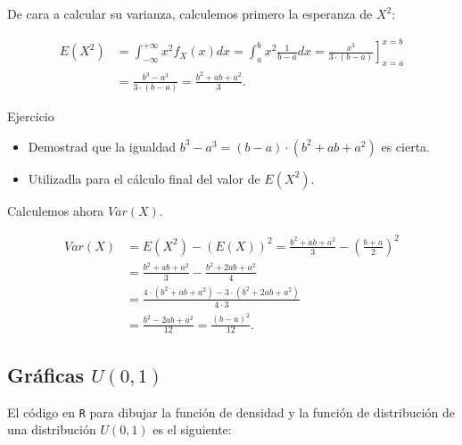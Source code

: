 \documentclass[
  letterpaper,
  DIV=11,
  numbers=noendperiod]{scrreprt}
\begin{document}
De cara a calcular su varianza, calculemos primero la esperanza de
\(X^2\):

\[
\begin{array}{rl}
E(X^2)&=\displaystyle\int_{-\infty}^{+\infty} x^2 f_X(x) dx=\int_{a}^{b} x^2 \frac1{b-a}
dx =\left.\frac{x^3}{3\cdot (b-a)}\right]_{x=a}^{x=b} \\
&=\displaystyle\frac{b^3-a^3}{3\cdot (b-a)}=\frac{b^2+ab+a^2}{3}.
\end{array}
\]

\begin{Ejercicio}{Ejercicio}{}

\begin{itemize}
\item
  Demostrad que la igualdad \(b^3-a^3=(b-a)\cdot (b^2+ab+a^2)\) es
  cierta.
\item
  Utilizadla para el cálculo final del valor de \(E(X^2)\).
\end{itemize}

\end{Ejercicio}

Calculemos ahora \(Var(X)\).

\[
\begin{array}{rl}
Var(X)&=\displaystyle E(X^2)-(E(X))^2=\frac{b^2+ab+a^2}3-\left(\frac{b+a}2\right)^2\\&=\displaystyle
\frac{b^2+ab+a^2}{3}-\frac{b^2+2ab+a^2}{4}\\
&=\displaystyle
\frac{4\cdot (b^2+ab+a^2)-3\cdot (b^2+2ab+a^2)}{4\cdot 3}
\\
&=\displaystyle
\frac{b^2-2ab+a^2}{12}=
\frac{(b-a)^2}{12}.
\end{array}
\]

\subsection{\texorpdfstring{Gráficas
\(U(0,1)\)}{Gráficas U(0,1)}}\label{gruxe1ficas-u01}

El código en \texttt{R} para dibujar la función de densidad y la función
de distribución de una distribución \(U(0,1)\) es el siguiente:
\end{document}

